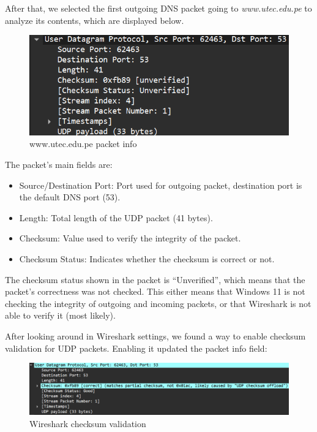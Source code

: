 After that, we selected the first outgoing DNS packet going to
\textit{www.utec.edu.pe} to analyze its contents, which are displayed below.

\begin{figure}[htbp]
    \centering
    \includegraphics[width=1\linewidth]{img/4.png}
    \caption{www.utec.edu.pe packet info}\label{fig:4}
\end{figure}

The packet's main fields are:

\begin{itemize}
    \item Source/Destination Port: Port used for outgoing packet, destination port is the
          default DNS port (53).
    \item Length: Total length of the UDP packet (41 bytes).
    \item Checksum: Value used to verify the integrity of the packet.
    \item Checksum Status: Indicates whether the checksum is correct or not.
\end{itemize}

The checksum status shown in the packet is ``Unverified'', which means that the
packet's correctness was not checked. This either means that Windows 11 is not
checking the integrity of outgoing and incoming packets, or that Wireshark is
not able to verify it (most likely).

After looking around in Wireshark settings, we found a way to enable checksum
validation for UDP packets. Enabling it updated the packet info field:

\begin{figure}[htbp]
    \centering
    \includegraphics[width=1\linewidth]{img/5.png}
    \caption{Wireshark checksum validation}\label{fig:5}
\end{figure}

